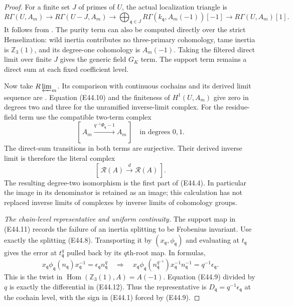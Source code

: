 \begin{proof}
For a finite set $J$ of primes of $U$,
the actual localization triangle is
\[
 R\Gamma(U,A_m)\longrightarrow
 R\Gamma(U-J,A_m)\longrightarrow
 \bigoplus_{\mathfrak q\in J}
       R\Gamma(k_{\mathfrak q},A_m(-1))[-1]
 \longrightarrow R\Gamma(U,A_m)[1].
 \tag{E44.11}
\]
It follows from
\cite[II.0.1(f), II.1.7(b)]{E_MilneADT}.
The purity term can also be computed
directly over the strict Henselization:
wild inertia contributes no three-primary
cohomology, tame inertia is
$\mathbb Z_3(1)$, and its degree-one
cohomology is $A_m(-1)$.
Taking the filtered direct limit over
finite $J$ gives the generic field
$G_K$ term. The support term remains
a direct sum at each fixed coefficient
level.

Now take $R\varprojlim_m$. Its comparison
with continuous cochains and its derived
limit sequence are
\cite[Theorem 2.2 and Proposition 1.6]{E_JannsenContinuous}.
Equation (E44.10) and the finiteness of
$H^1(U,A_m)$ give zero in degrees two
and three for the unramified inverse-limit
complex. For the residue-field term use
the compatible two-term complex
\[
 [\,A_m\xrightarrow{q^{-1}\Phi_{\mathfrak q}-1}A_m\,]
                \quad\text{in degrees }0,1.
 \tag{E44.12}
\]
The direct-sum transitions in both terms
are surjective. Their derived inverse
limit is therefore the literal complex
\[
 [\,\mathcal R(A)\xrightarrow{d}\mathcal R(A)\,].
 \tag{E44.13}
\]
The resulting degree-two isomorphism is
the first part of (E44.4). In particular
the image in its denominator is retained
as an image; this calculation has not
replaced inverse limits of complexes by
inverse limits of cohomology groups.

\emph{The chain-level representative and uniform continuity.}
The support map in (E44.11) records the
failure of an inertia splitting to be
Frobenius invariant. Use exactly the
splitting (E44.8). Transporting it by
$(x_{\mathfrak q},\phi_{\mathfrak q})$
and evaluating at $t_{\mathfrak q}$
gives the error at $t_{\mathfrak q}^q$
pulled back by its $q$th-root map.
In formulas,
\[
 x_{\mathfrak q}\phi_{\mathfrak q}(n_{\mathfrak q})
          x_{\mathfrak q}^{-1}
       =\epsilon_{\mathfrak q}n_{\mathfrak q}^q
 \quad\Longrightarrow\quad
 x_{\mathfrak q}\phi_{\mathfrak q}(n_{\mathfrak q}^{q^{-1}})
          x_{\mathfrak q}^{-1}n_{\mathfrak q}^{-1}
       =q^{-1}\epsilon_{\mathfrak q}.
 \tag{E44.14}
\]
This is the twist in
$\operatorname{Hom}(\mathbb Z_3(1),A)=A(-1)$.
Equation (E44.9) divided by $q$ is
exactly the differential in (E44.12).
Thus the representative is
$D_{\mathfrak q}=q^{-1}\epsilon_{\mathfrak q}$
at the cochain level, with the sign in
(E44.1) forced by (E44.9).


\end{proof}
